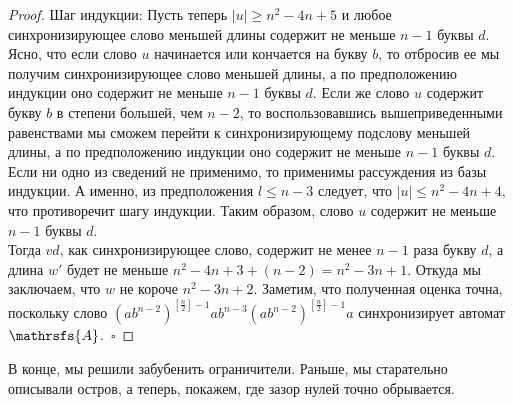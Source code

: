 \documentclass[11pt]{article}
\begin{document}
\begin{proof}
Шаг индукции: Пусть теперь $|u| \geq n^2 - 4n + 5$ и любое синхронизирующее слово меньшей длины содержит не меньше $n - 1$ буквы $d$.
Ясно, что если слово $u$ начинается или кончается на букву $b$, то отбросив ее мы получим синхронизирующее слово меньшей длины, а по
предположению индукции оно содержит не меньше $n - 1$ буквы $d$. Если же слово $u$ содержит букву $b$ в степени большей, чем $n - 2$,
то воспользовавшись вышеприведенными равенствами мы сможем перейти к синхронизирующему подслову меньшей длины, а по
предположению индукции оно содержит не меньше $n - 1$ буквы $d$. Если ни одно из сведений не применимо, то применимы рассуждения
из базы индукции. А именно, из предположения $l \leq n - 3$ следует, что $|u| \leq n^2 - 4n + 4$, что противоречит шагу индукции.
Таким образом, слово $u$ содержит не меньше $n - 1$ буквы $d$.\\
Тогда $vd$, как синхронизирующее слово, содержит не менее $n - 1$ раза букву $d$, 
а длина $w'$ будет не меньше $n^2 - 4n + 3 + (n - 2) = n^2 - 3n + 1$.
Откуда мы заключаем, что $w$ не короче $n^2 - 3n + 2$. Заметим, что полученная оценка точна, поскольку слово 
$(ab^{n - 2})^{\left[\frac{n}{2}\right] - 1}ab^{n - 3}(ab^{n - 2})^{\left[\frac{n}{2}\right] - 1}a$ 
синхронизирует автомат $\mathrsfs{A}$.~$\square$


\end{proof}

В конце, мы решили забубенить ограничители. Раньше, мы старательно описывали остров, а теперь, покажем,
где зазор нулей точно обрывается.
\end{document}
